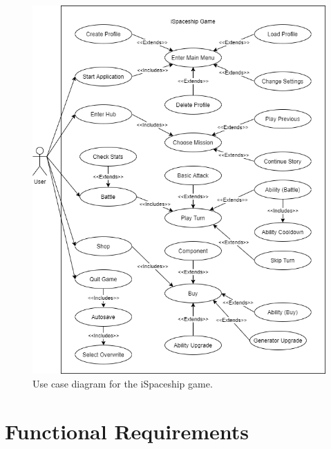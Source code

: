 \documentclass[]{article}
\begin{document}
\begin{figure}[H]
    \centering
    \includegraphics[width=\textwidth]{UseCaseDiagram2.png}
    \caption{Use case diagram for the iSpaceship game.}
\end{figure}


\section{Functional Requirements}
\label{sec:functional_requirements}






\end{document}
